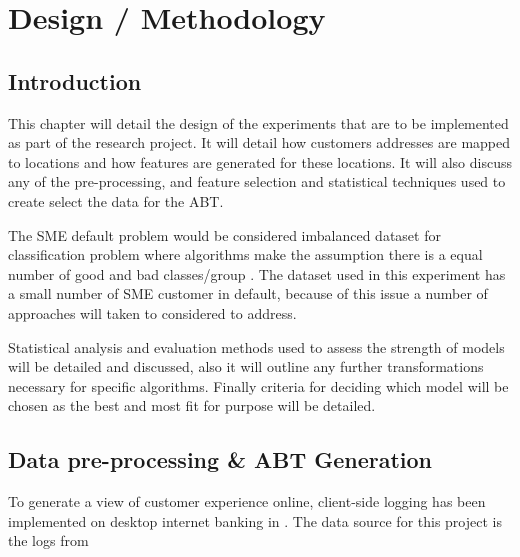 
\chapter{Design / Methodology} %

\label{Chapter3} %


\section{Introduction}

This chapter will detail the design of the experiments that are to be implemented as part of the research project. It will detail how customers addresses are mapped to locations and how features are generated for these locations. It will also discuss any of the pre-processing, and feature selection and statistical techniques used to create select the data for the ABT.

The SME default problem would be considered imbalanced dataset for classification problem where algorithms make the assumption there is a equal number of good and bad classes/group \citep{japkowicz_class_2000}. The dataset used in this experiment has a small number of SME customer in default, because of this issue a number of approaches will taken to considered to address.

Statistical analysis and evaluation methods used to assess the strength of models will be detailed and discussed, also it will outline any further transformations necessary for specific algorithms. Finally criteria for deciding which model will be chosen as the best and most fit for purpose will be detailed.

\section{Data pre-processing \& ABT Generation}
To generate a view of customer experience online, client-side logging has been implemented on desktop internet banking in \subjectname. The data source for this project is the logs from


